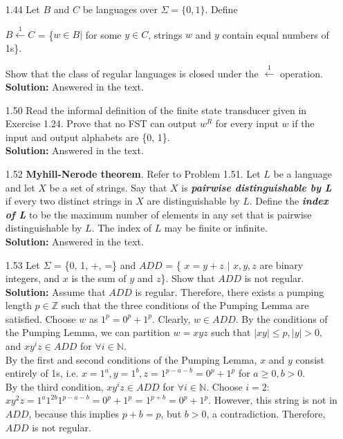 \begin{enumerate}
\item[1.44]Let $B$ and $C$ be languages over $\Sigma = \{0, 1\}$. Define
\begin{center}
$B \xleftarrow{1} C$ = \{$w \in B |$ for some $y \in C$, strings $w$ and $y$ contain equal numbers of 1s\}. 
\end{center}
Show that the class of regular languages is closed under the $\xleftarrow{1}$ operation.
\\
\textbf{Solution:} Answered in the text.

\item[1.50]Read the informal definition of the finite state transducer given in Exercise 1.24. Prove that no FST can output $w^R$ for every input $w$ if the input and output alphabets are \{0, 1\}.
\\
\textbf{Solution:} Answered in the text.

\item[1.52]\textbf{Myhill-Nerode theorem}. Refer to Problem 1.51. Let $L$ be a language and let $X$ be a set of strings. Say that $X$ is \textbf{\emph{pairwise distinguishable by L}} if every two distinct strings in $X$ are distinguishable by $L$. Define the \textbf{\emph{index of L}} to be the maximum number of elements in any set that is pairwise distinguishable by $L$. The index of $L$ may be finite or infinite.
\\
\textbf{Solution:} Answered in the text.

\item[1.53]Let $\Sigma$ = \{0, 1, +, =\} and $ADD$ = \{ $x = y + z$ $|$ $x, y, z$ are binary integers, and $x$ is the sum of $y$ and $z$\}. Show that $ADD$ is not regular.
\\
\textbf{Solution:} Assume that $ADD$ is regular. Therefore, there exists a pumping length $p \in \mathbb{Z}$ such that the three conditions of the Pumping Lemma are satisfied. Choose $w$ as $1^p=0^p+1^p$. Clearly, $w \in ADD$. By the conditions of the Pumping Lemma, we can partition $w = xyz$ such that $|xy| \le p, |y| > 0$, and $xy^iz \in ADD$ for $\forall i \in \mathbb{N}$.
\\
By the first and second conditions of the Pumping Lemma, $x$ and $y$ consist entirely of 1s, i.e. $x = 1^a, y = 1^b, z = 1^{p-a-b}=0^p+1^p$ for $a \ge 0, b > 0$.
\\
By the third condition, $xy^iz \in ADD$ for $\forall i \in \mathbb{N}$. Choose $i=2$: $xy^2z = 1^a1^{2b}1^{p-a-b}=0^p+1^p$ = $1^{p+b}=0^p+1^p$. However, this string is not in $ADD$, because this implies $p+b = p$, but $b > 0$, a contradiction. Therefore, $ADD$ is not regular.


\end{enumerate}

